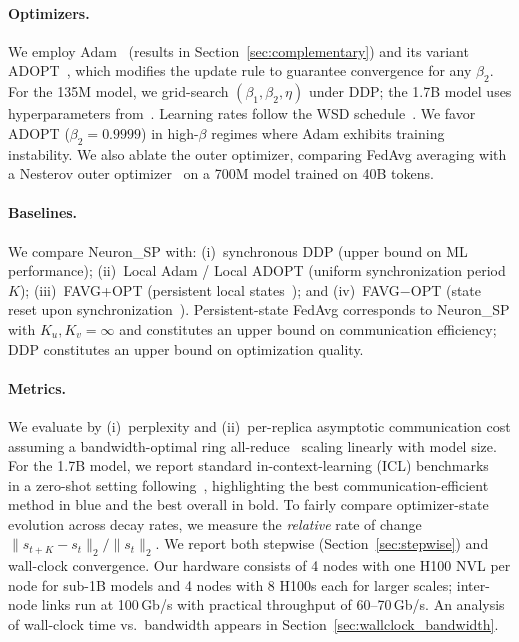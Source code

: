 \documentclass{article}
\begin{document}
\paragraph{Optimizers.}
We employ Adam~\citep{kingma2015adam} (results in
Section~\ref{sec:complementary}) and its variant
ADOPT~\citep{taniguchi2024adopt}, which modifies the update rule to
guarantee convergence for any $\beta_2$. For the 135M model, we
grid-search $(\beta_1, \beta_2, \eta)$ under DDP; the 1.7B model uses
hyperparameters from~\citet{allal2025smollm2,taniguchi2024adopt}.
Learning rates follow the WSD
schedule~\citep{hagele2024scaling,allal2025smollm2}. We favor ADOPT
($\beta_2 = 0.9999$) in high-$\beta$ regimes where Adam exhibits
training instability. We also ablate the outer optimizer, comparing
FedAvg averaging with a Nesterov outer
optimizer~\citep{reddi2021adaptive,douillard2023diloco,charles2025communication}
on a 700M model trained on 40B tokens.

\paragraph{Baselines.}
We compare Neuron\_SP with: (i)~synchronous DDP (upper bound on ML
performance); (ii)~Local Adam / Local ADOPT (uniform synchronization
period $K$); (iii)~FAVG+OPT (persistent local
states~\citep{sani2025photon,douillard2023diloco}); and
(iv)~FAVG$-$OPT (state reset upon
synchronization~\citep{sani2024future,iacob2025dept}).
Persistent-state FedAvg corresponds to Neuron\_SP with
$K_u, K_v = \infty$ and constitutes an upper bound on communication
efficiency; DDP constitutes an upper bound on optimization quality.

\paragraph{Metrics.}
We evaluate by (i)~perplexity and (ii)~per-replica asymptotic
communication cost assuming a bandwidth-optimal ring
all-reduce~\citep{sergeev2018horovod} scaling linearly with model
size. For the 1.7B model, we report standard in-context-learning
(ICL) benchmarks~\citep{brown2020language} in a zero-shot setting
following~\citet{allal2025smollm2}, highlighting the best
communication-efficient method in blue and the best overall in bold.
To fairly compare optimizer-state evolution across decay rates, we
measure the \emph{relative} rate of change
$\|s_{t+K} - s_t\|_2 / \|s_t\|_2$. We report both stepwise
(Section~\ref{sec:stepwise}) and wall-clock convergence. Our hardware
consists of 4 nodes with one H100 NVL per node for sub-1B models and
4 nodes with 8 H100s each for larger scales; inter-node links run at
100\,Gb/s with practical throughput of 60--70\,Gb/s. An analysis of
wall-clock time vs.\ bandwidth appears in
Section~\ref{sec:wallclock_bandwidth}.
\end{document}
